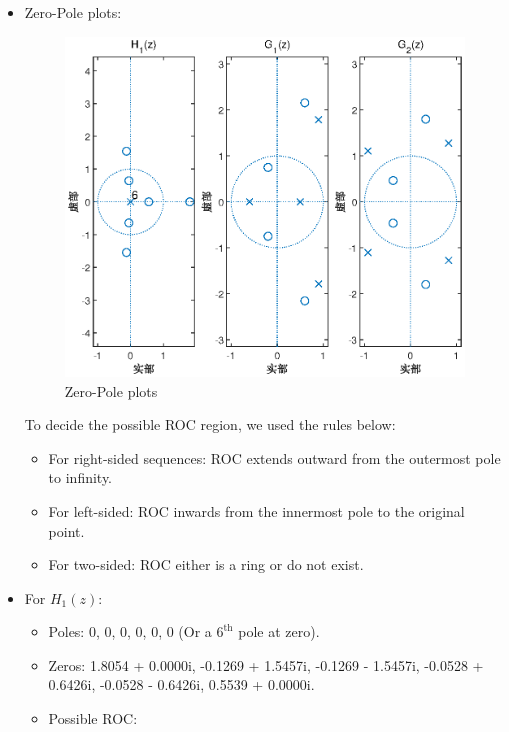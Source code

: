 \documentclass[onecolumn,oneside]{SUSTechHomework}
\begin{document}
\begin{itemize}
    \item Zero-Pole plots:
    \begin{figure}[H]
        \centering
        \includegraphics[width=140mm]{pictures/q6_2_2.eps}
        \caption{Zero-Pole plots}
    \end{figure}
    \begin{info}
        To decide the possible ROC region, we used the rules below:
        \begin{itemize}
            \item For right-sided sequences: ROC extends outward from the outermost pole to infinity.
            \item For left-sided: ROC inwards from the innermost pole to the original point.
            \item For two-sided: ROC either is a ring or do not exist.
        \end{itemize}
    \end{info}
    \item For $H_1(z)$:
    \begin{itemize}
        \item Poles: 0, 0, 0, 0, 0, 0 (Or a $6^{\text{th}}$ pole at zero).
        \item Zeros: 1.8054 + 0.0000i, -0.1269 + 1.5457i, -0.1269 - 1.5457i, -0.0528 + 0.6426i, -0.0528 - 0.6426i, 0.5539 + 0.0000i.
        \item Possible ROC:
        \begin{itemize}

\end{itemize}
\end{itemize}
\end{itemize}
\end{document}

